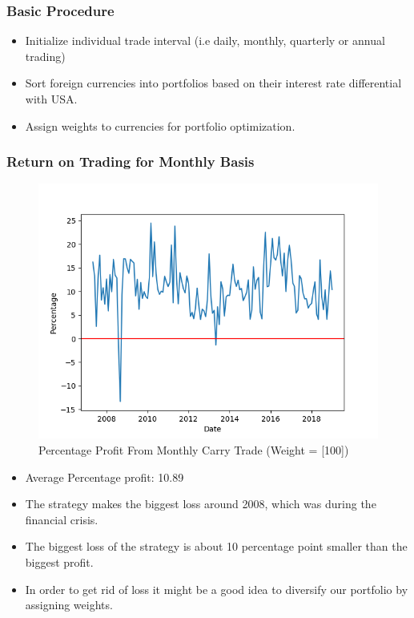 \documentclass{article}
\begin{document}
\subsubsection{Basic Procedure}

\begin{itemize}
  \item Initialize individual trade interval (i.e daily, monthly, quarterly or annual trading)
  \item Sort foreign currencies into portfolios based on their interest rate differential with USA.
  \item Assign weights to currencies for portfolio optimization.
\end{itemize}

\subsubsection{Return on Trading for Monthly Basis}

\vspace*{-6.8mm}

\begin{figure}[H]
    \centering
    \includegraphics[scale=.75]{images/carryTrade/monthly1.png}
    \caption{Percentage Profit From Monthly Carry Trade (Weight = [100])}
    \label{simulationfigure}
\end{figure}

\begin{itemize}
  \item Average Percentage profit: 10.89
  \item The strategy makes the biggest loss around 2008, which was during the financial crisis.
  \item The biggest loss of the strategy is about 10 percentage point smaller than the biggest profit.
  \item In order to get rid of loss it might be a good idea to diversify our portfolio by assigning weights.
\end{itemize}
\end{document}
